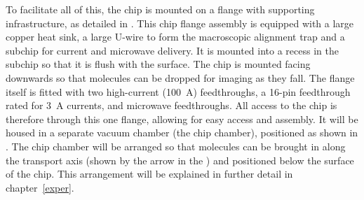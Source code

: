 To facilitate all of this, the chip is mounted on a flange with supporting
infrastructure, as detailed in . This chip
flange assembly is equipped with a large copper heat sink, a large U-wire to
form the macroscopic alignment trap and a subchip for current and microwave
delivery. It is mounted into a recess in the subchip so that it is flush with
the surface. The chip is mounted facing downwards so that molecules can be
dropped for imaging as they fall. The flange itself is fitted with two
high-current (\SI{100}{\ampere}) feedthroughs, a 16-pin feedthrough rated for
\SI{3}{\ampere} currents, and microwave feedthroughs. All access to the chip is
therefore through this one flange, allowing for easy access and assembly.  It
will be housed in a separate vacuum chamber (the chip chamber), positioned as
shown in . The chip chamber will be
arranged so that molecules can be brought in along the transport axis (shown by
the arrow in the ) and positioned
below the surface of the chip.  This arrangement will be explained in further
detail in chapter~\ref{exper}.
